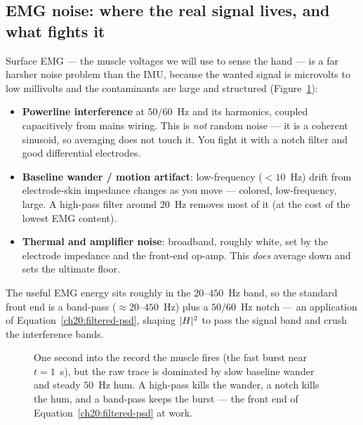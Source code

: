 \subsection{EMG noise: where the real signal lives, and what fights it}

Surface EMG --- the muscle voltages we will use to sense the hand --- is a far
harsher noise problem than the IMU, because the wanted signal is microvolts to
low millivolts and the contaminants are large and structured
(Figure~\ref{ch20:fig-emg}):
\begin{itemize}
  \item \textbf{Powerline interference} at $50/60$~Hz and its harmonics, coupled
        capacitively from mains wiring. This is \emph{not} random noise --- it is a
        coherent sinusoid, so averaging does not touch it. You fight it with a
        notch filter and good differential electrodes.
  \item \textbf{Baseline wander / motion artifact}: low-frequency ($<10$~Hz)
        drift from electrode-skin impedance changes as you move --- colored,
        low-frequency, large. A high-pass filter around $20$~Hz removes most of
        it (at the cost of the lowest EMG content).
  \item \textbf{Thermal and amplifier noise}: broadband, roughly white, set by
        the electrode impedance and the front-end op-amp. This \emph{does}
        average down and sets the ultimate floor.
\end{itemize}
The useful EMG energy sits roughly in the $20$--$450$~Hz band, so the standard
front end is a band-pass ($\approx 20$--$450$~Hz) plus a $50/60$~Hz notch ---
an application of Equation~\eqref{ch20:filtered-psd}, shaping
$\lvert H\rvert^2$ to pass the signal band and crush the interference bands.

\begin{figure}[H]
\centering
{}
\caption{One second into the record the muscle fires (the fast burst near
$t=1$~s), but the raw trace is dominated by slow baseline wander and steady
$50$~Hz hum. A high-pass kills the wander, a notch kills the hum, and a band-pass
keeps the burst --- the front end of Equation~\eqref{ch20:filtered-psd} at work.}
\label{ch20:fig-emg}
\end{figure}

